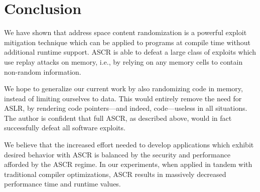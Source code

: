 \documentclass[10pt,twocolumn]{article}
\begin{document}
\section{Conclusion}

We have shown that address space content randomization is a powerful exploit
mitigation technique which can be applied to programs at compile time without
additional runtime support. ASCR is able to defeat a large class of exploits
which use replay attacks on memory, i.e., by relying on any memory cells to
contain non-random information.

We hope to generalize our current work by also randomizing code in memory,
instead of limiting ourselves to data. This would entirely remove the need for
ASLR, by rendering code pointers---and indeed, code---useless in all situations.
The author is confident that full ASCR, as described above, would in fact
successfully defeat all software exploits.

We believe that the increased effort needed to develop applications which
exhibit desired behavior with ASCR is balanced by the security and performance
afforded by the ASCR regime. In our experiments, when applied in tandem with
traditional compiler optimizations, ASCR results in massively decreased
performance time and runtime values. 

{}

\end{document}

